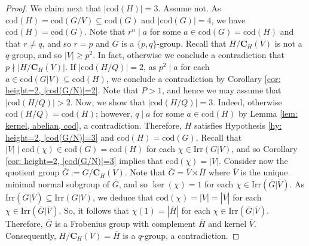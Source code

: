 \documentclass[9pt]{article}
\begin{document}
\begin{proof}
    We claim next that $|\mathrm{cod}(H)|=3$.
    Assume not.
	As $\mathrm{cod}(H)=\mathrm{cod}(G/V)\subseteq \mathrm{cod}(G)$ and $|\mathrm{cod}(G)|=4$,
	we have $\mathrm{cod}(H)=\mathrm{cod}(G)$.
    Note that $r^{n}\mid a$ for some $a\in \mathrm{cod}(G)= \mathrm{cod}(H)$ 
	and that
	$r\neq q$,
    and so $r=p$ and $G$ is a $\{ p,q \}$-group.	
    Recall that $H/\mathbf{C}_{H}(V)$ is not a $q$-group,
	and so $|V|\geq p^{2}$.
	In fact, otherwise we conclude a contradiction that $p\nmid |H/\mathbf{C}_{H}(V)|$.
	If $|\mathrm{cod}(H/Q)|=2$, as $p^{2}\mid a$ for each $a \in \mathrm{cod}(G|V)\subseteq \mathrm{cod}(H)$,
    we conclude a contradiction by Corollary \ref{cor: height=2, |cod(G/N)|=2}.
	Note that $P>1$, and hence we may assume that $|\mathrm{cod}(H/Q)|> 2$.
    Now, we show that $|\mathrm{cod}(H/Q)|=3$.
	Indeed, otherwise $\mathrm{cod}(H/Q)=\mathrm{cod}(H)$;
	however, $q\mid a$ for some $a\in \mathrm{cod}(H)$ by Lemma \ref{lem: kernel, abelian, cod},
	a contradiction.
	Therefore, $H$ satisfies Hypothesis \ref{hy: height=2, |cod(G/N)|=3} and $\mathrm{cod}(H)=\mathrm{cod}(G)$.
    Recall that $|V|\mid \mathrm{cod}(\chi)\in \mathrm{cod}(G)=\mathrm{cod}(H)$ for each $\chi \in \mathrm{Irr}(G|V)$,
	and so Corollary \ref{cor: height=2, |cod(G/N)|=3} implies that 
	$\mathrm{cod}(\chi)=|V|$.
	Consider now the quotient group $\overline{G}:=G/\mathbf{C}_{H}(V)$.
    Note that $\overline{G}=\overline{V} \rtimes \overline{H}$ where $\overline{V}$
	is the unique minimal normal subgroup of $\overline{G}$,
	and so $\ker(\chi)=1$ for each $\chi\in \mathrm{Irr}(\overline{G}|\overline{V})$.
   As $\mathrm{Irr}(\overline{G}|\overline{V})\subseteq \mathrm{Irr}(G|V)$,
   we deduce that $\mathrm{cod}(\chi)=|V|=|\overline{V}|$ for each $\chi\in \mathrm{Irr}(\overline{G}|\overline{V})$.
  So, it follows that $\chi(1)=|\overline{H}|$ for each $\chi\in \mathrm{Irr}(\overline{G}|\overline{V})$.
   Therefore, $\overline{G}$ is a Frobenius group with complement $\overline{H}$ and kernel $\overline{V}$.
   Consequently, $H/\mathbf{C}_{H}(V)=\overline{H}$ is a $q$-group,
    a contradiction.
 
 
   


\end{proof}
\end{document}
